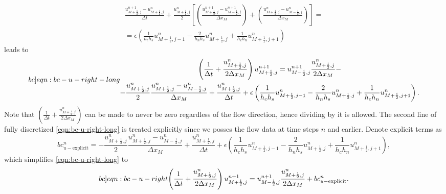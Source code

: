 \documentclass{article}
\numberwithin{equation}{section}
\begin{document}
\begin{equation*}
\begin{gathered}
\frac{{u}^{n+1}_{M+\frac{1}{2},j}-{u}^n_{M+\frac{1}{2},j}}{\Delta t}
+\frac{u^n_{M+\frac{1}{2},j}}{2}
\left[
\left(
	\frac{u^{n+1}_{M+\frac{1}{2},j}-u^{n+1}_{M-\frac{1}{2},j}}{\Delta x_M}
\right)
+\left(
	\frac{u^{n}_{M+\frac{1}{2},j}-u^{n}_{M-\frac{1}{2},j}}{\Delta x_M}
\right)
\right] =\\
=\epsilon\left(\frac{1}{h_c h_s}u^{n}_{M+\frac{1}{2},j-1} - \frac{2}{h_n h_s}u^{n}_{M+\frac{1}{2},j} + \frac{1}{h_c h_n}u^n_{M+\frac{1}{2},j+1}\right)
\end{gathered}
\end{equation*}
leads to %
\begin{equation}\label[bc]{eqn:bc-u-right-long}
\begin{gathered}
\left(\frac{1}{\Delta t} + \frac{u^n_{M+\frac{1}{2},j}}{2\Delta x_M}\right){{u}^{n+1}_{M+\frac{1}{2},j}}
=
u^{n+1}_{M-\frac{1}{2},j}\frac{u^n_{M+\frac{1}{2},j}}{2\Delta x_M}-\\
-\frac{u^n_{M+\frac{1}{2},j}}{2}\frac{u^{n}_{M+\frac{1}{2},j}-u^{n}_{M-\frac{1}{2},j}}{\Delta x_M}
+\frac{{u}^n_{M+\frac{1}{2},j}}{\Delta t}
+\epsilon\left(\frac{1}{h_c h_s}u^{n}_{M+\frac{1}{2},j-1} - \frac{2}{h_n h_s}u^{n}_{M+\frac{1}{2},j} + \frac{1}{h_c h_n}u^n_{M+\frac{1}{2},j+1}\right).
\end{gathered}
\end{equation}
Note that $\left(\frac{1}{\Delta t} + \frac{u^n_{M+\frac{1}{2},j}}{2\Delta x_M}\right)$ can be made to never be zero regardless of the flow direction, hence dividing by it is allowed. The second line of fully discretized \cref{eqn:bc-u-right-long} is treated explicitly since we posses the flow data at time steps $n$ and earlier. Denote explicit terms as
\begin{equation*}
	bc_{u-\text{explicit}}^n=-\frac{u^n_{M+\frac{1}{2},j}}{2}\frac{u^{n}_{M+\frac{1}{2},j}-u^{n}_{M-\frac{1}{2},j}}{\Delta x_M}
+\frac{{u}^n_{M+\frac{1}{2},j}}{\Delta t}
+\epsilon\left(\frac{1}{h_c h_s}u^{n}_{M+\frac{1}{2},j-1} - \frac{2}{h_n h_s}u^{n}_{M+\frac{1}{2},j} + \frac{1}{h_c h_n}u^n_{M+\frac{1}{2},j+1}\right),
\end{equation*}
which simplifies \cref{eqn:bc-u-right-long} to 
\begin{equation}\label[bc]{eqn:bc-u-right}
\begin{gathered}
\left(\frac{1}{\Delta t} + \frac{u^n_{M+\frac{1}{2},j}}{2\Delta x_M}\right){{u}^{n+1}_{M+\frac{1}{2},j}}
=
u^{n+1}_{M-\frac{1}{2},j}\frac{u^n_{M+\frac{1}{2},j}}{2\Delta x_M}+bc_{u-\text{explicit}}^n.
\end{gathered}
\end{equation}
\end{document}

